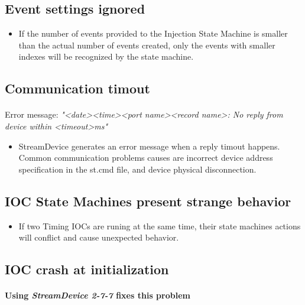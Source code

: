 \documentclass[openany]{article}
\begin{document}
	\subsection{Event settings ignored}
		\begin{itemize}
		\item If the number of events provided to the Injection State Machine is smaller than the actual number of events created, only the events with smaller indexes will be recognized by the state machine.
		\end{itemize}

	\subsection{Communication timout}

		\paragraph{} Error message: \emph{"\textless date\textgreater \textless time\textgreater \textless port name\textgreater \textless record name\textgreater: No reply from device within \textless timeout\textgreater ms"}

		\begin{itemize}
		\item StreamDevice generates an error message when a reply timout happens. Common communication problems causes are incorrect device address specification in the st.cmd file, and device physical disconnection.
		\end{itemize}

	\subsection{IOC State Machines present strange behavior}

		\begin{itemize}
		\item If two Timing IOCs are runing at the same time, their state machines actions will conflict and cause unexpected behavior.
		\end{itemize}

	\subsection{IOC crash at initialization}

		\paragraph{\color{red} Using \emph{StreamDevice 2-7-7} fixes this problem}
\end{document}
